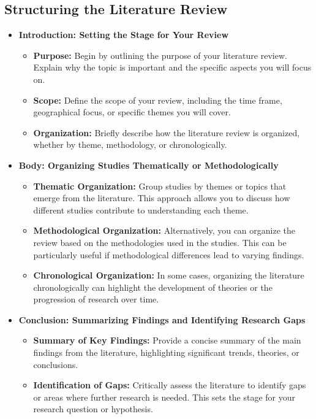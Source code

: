 \documentclass[
]{book}
\providecommand{\tightlist}{%
  \setlength{\itemsep}{0pt}\setlength{\parskip}{0pt}}
\begin{document}
\hypertarget{structuring-the-literature-review}{%
\subsection*{Structuring the Literature Review}\label{structuring-the-literature-review}}

\begin{itemize}
\tightlist
\item
  \textbf{Introduction: Setting the Stage for Your Review}

  \begin{itemize}
  \tightlist
  \item
    \textbf{Purpose:} Begin by outlining the purpose of your literature review. Explain why the topic is important and the specific aspects you will focus on.
  \item
    \textbf{Scope:} Define the scope of your review, including the time frame, geographical focus, or specific themes you will cover.
  \item
    \textbf{Organization:} Briefly describe how the literature review is organized, whether by theme, methodology, or chronologically.
  \end{itemize}
\item
  \textbf{Body: Organizing Studies Thematically or Methodologically}

  \begin{itemize}
  \tightlist
  \item
    \textbf{Thematic Organization:} Group studies by themes or topics that emerge from the literature. This approach allows you to discuss how different studies contribute to understanding each theme.
  \item
    \textbf{Methodological Organization:} Alternatively, you can organize the review based on the methodologies used in the studies. This can be particularly useful if methodological differences lead to varying findings.
  \item
    \textbf{Chronological Organization:} In some cases, organizing the literature chronologically can highlight the development of theories or the progression of research over time.
  \end{itemize}
\item
  \textbf{Conclusion: Summarizing Findings and Identifying Research Gaps}

  \begin{itemize}
  \tightlist
  \item
    \textbf{Summary of Key Findings:} Provide a concise summary of the main findings from the literature, highlighting significant trends, theories, or conclusions.
  \item
    \textbf{Identification of Gaps:} Critically assess the literature to identify gaps or areas where further research is needed. This sets the stage for your research question or hypothesis.
  \end{itemize}
\end{itemize}
\end{document}

